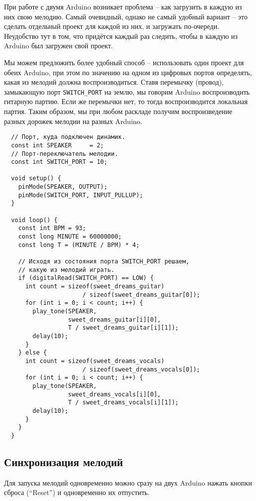 \documentclass[../sparc.tex]{subfiles}
\begin{document}
При работе с двумя Arduino возникает проблема -- как загрузить в каждую из них
свою мелодию.  Самый очевидный, однако не самый удобный вариант -- это сделать
отдельный проект для каждой из них, и загружать по-очереди.  Неудобство тут в
том, что придётся каждый раз следить, чтобы в каждую из Arduino был загружен
свой проект.

Мы можем предложить более удобный способ -- использовать один проект для обеих
Arduino, при этом по значению на одном из цифровых портов определять, какая из
мелодий должна воспроизводиться.  Ставя перемычку (провод), замыкающую порт
\texttt{SWITCH\_PORT} на землю, мы говорим Arduino воспроизводить гитарную
партию.  Если же перемычки нет, то тогда воспроизводится локальная партия.
Таким образом, мы при любом раскладе получим воспроизведение разных дорожек
мелодии на разных Arduino.

\begin{verbatim}
  // Порт, куда подключен динамик.
  const int SPEAKER     = 2;
  // Порт-переключатель мелодии.
  const int SWITCH_PORT = 10;

  void setup() {
    pinMode(SPEAKER, OUTPUT);
    pinMode(SWITCH_PORT, INPUT_PULLUP);
  }

  void loop() {
    const int BPM = 93;
    const long MINUTE = 60000000;
    const long T = (MINUTE / BPM) * 4;

    // Исходя из состояния порта SWITCH_PORT решаем,
    // какую из мелодий играть.
    if (digitalRead(SWITCH_PORT) == LOW) {
      int count = sizeof(sweet_dreams_guitar)
                      / sizeof(sweet_dreams_guitar[0]);
      for (int i = 0; i < count; i++) {
        play_tone(SPEAKER,
                  sweet_dreams_guitar[i][0],
                  T / sweet_dreams_guitar[i][1]);
        delay(10);
      }
    } else {
      int count = sizeof(sweet_dreams_vocals)
                      / sizeof(sweet_dreams_vocals[0]);
      for (int i = 0; i < count; i++) {
        play_tone(SPEAKER,
                  sweet_dreams_vocals[i][0],
                  T / sweet_dreams_vocals[i][1]);
        delay(10);
      }
    }
  }
\end{verbatim}

\subsection{Синхронизация мелодий}

Для запуска мелодий одновременно можно сразу на двух Arduino нажать кнопки
сброса (``Reset'') и одновременно их отпустить.
\end{document}
